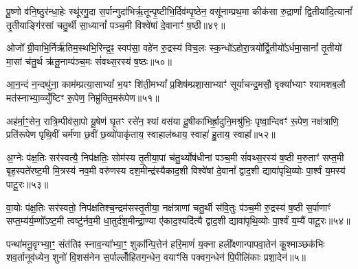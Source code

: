 पू॒ष्णो व॑नि॒ष्ठुर॑न्धा॒हेः स्थू॑रगु॒दा स॒र्पान्गुदा॑भिर्\mbox{}ऋ॒तून्पृ॒ष्टीभि॒र्दिव॑म्पृ॒ष्ठेन॒ वसू॑नाम्प्रथ॒मा कीक॑सा रु॒द्राणां᳚ द्वि॒तीया॑दि॒त्यानां᳚ तृ॒तीयाङ्गि॑रसां चतु॒र्थी सा॒ध्यानां᳚ पञ्च॒मी विश्वे॑षां दे॒वानाꣳ॑ ष॒ष्ठी॥४९॥

{\anuvakamend[{पू॒ष्णश्चतु॑र्विꣳशतिः॥17॥}]}

ओजो᳚ ग्री॒वाभि॒र्निर्\mbox{}ऋ॑तिम॒स्थभि॒रिन्द्र॒ꣴ॒ स्वप॑सा॒ वहे॑न रु॒द्रस्य॑ विच॒लः स्क॒न्धो॑\-ऽहोरा॒त्रयो᳚र्द्वि॒तीयो᳚\-ऽर्धमा॒सानां᳚ तृ॒तीयो॑ मा॒सां च॑तु॒र्थ ऋ॑तू॒नाम्प॑ञ्च॒मः सं॑वथ्स॒रस्य॑ ष॒ष्ठः॥५०॥

{\anuvakamend[{ओजो॑ विꣳश॒तिः॥18॥}]}

आ॒न॒न्दं न॒न्दथु॑ना॒ काम॑म्प्रत्या॒सा\-भ्यां᳚ भ॒यꣳ शि॑ती॒म\-भ्यां᳚ प्र॒शिष॑म्प्रशा॒साभ्याꣳ॑ सूर्याचन्द्र॒मसौ॒ वृक्या᳚भ्याꣳ श्यामशब॒लौ मत॑स्नाभ्या॒व्व्युँ॑ष्टिꣳ रू॒पेण॒ निम्रु॑क्ति॒मरू॑पेण॥५१॥

{\anuvakamend[{आ॒न॒न्दꣳ षोड॑श॥19॥}]}

अह॑र्मा॒ꣳ॒सेन॒ रात्रि॒म्पीव॑सा॒पो यू॒षेण॑ घृ॒तꣳ रसे॑न॒ श्यां वस॑या दू॒षीका॑भिर्\mbox{}ह्रा॒दुनि॒मश्रु॑भिः॒ पृष्वा॒न्दिवꣳ॑ रू॒पेण॒ नक्ष॑त्राणि॒ प्रति॑रूपेण पृथि॒वीं चर्म॑णा छ॒वीं छ॒व्यो॑पाकृ॑ताय॒ स्वाहाल॑ब्धाय॒ स्वाहा॑ हु॒ताय॒ स्वाहा᳚॥५२॥

{\anuvakamend[{अह॑र॒ष्टाविꣳ॑शतिः॥20॥}]}

अ॒ग्नेः प॑क्ष॒तिः सर॑स्वत्यै॒ निप॑क्षतिः॒ सोम॑स्य तृ॒तीया॒पां च॑तु॒र्थ्योष॑धीनां पञ्च॒मी सं॑वथ्स॒रस्य॑ ष॒ष्ठी म॒रुताꣳ॑ सप्त॒मी बृह॒स्पते॑रष्ट॒मी मि॒त्रस्य॑ नव॒मी वरु॑णस्य दश॒मीन्द्र॑स्यैकाद॒शी विश्वे॑षां दे॒वानां᳚ द्वाद॒शी द्यावा॑पृथि॒व्योः पा॒र्श्वं य॒मस्य॑ पाटू॒रः॥५३॥

{\anuvakamend[{अ॒ग्नेरेका॒न्नत्रि॒ꣳ॒शत्॥21॥}]}

वा॒योः प॑क्ष॒तिः सर॑स्वतो॒ निप॑क्षतिश्च॒न्द्रम॑सस्तृ॒तीया॒ नक्ष॑त्राणां चतु॒र्थी स॑वि॒तुः प॑ञ्च॒मी रु॒द्रस्य॑ ष॒ष्ठी स॒र्पाणाꣳ॑ सप्त॒म्य॑र्य॒म्णो᳚\-ऽष्ट॒मी त्वष्टु॑र्नव॒मी धा॒तुर्द॑श॒मीन्द्रा॒ण्या ए॑काद॒श्यदि॑त्यै द्वाद॒शी द्यावा॑पृथि॒व्योः पा॒र्श्वं य॒म्यै॑ पाटू॒रः॥५४॥

{\anuvakamend[{वा॒योर॒ष्टाविꣳ॑शतिः॥22॥}]}

पन्था॑मनू॒वृग्भ्या॒ꣳ॒ संत॑तिꣴ स्नाव॒न्या᳚भ्या॒ꣳ॒ शुका᳚न्पि॒त्तेन॑ हरि॒माणं॑ य॒क्ना हली᳚क्ष्णान्पापवा॒तेन॑ कू॒श्माञ्छक॑भिः शव॒र्तानूव॑ध्येन॒ शुनो॑ वि॒शस॑नेन स॒र्पाल्लोँ॑हितग॒न्धेन॒ वयाꣳ॑सि पक्वग॒न्धेन॑ पि॒पीलि॑काः प्रशा॒देन॑॥५॥

{\anuvakamend[{पन्था॒न्द्वाविꣳ॑शतिः॥23॥}]}

